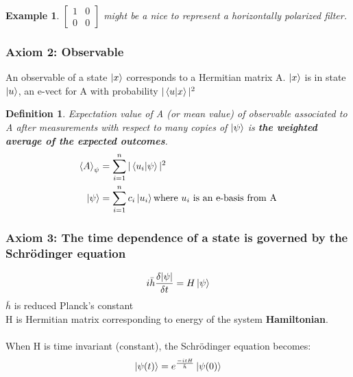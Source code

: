 \documentclass[12pt]{article}
\theoremstyle{plain}
\theoremstyle{nonumberplain}
\theoremstyle{plain}
\newtheorem{definition}[lemma]{Definition}
\newtheorem{example}[lemma]{Example}
\theoremstyle{nonumberplain}
\newcommand\1{{\bf 1}}
\newcommand{\bmat}[1]{\begin{bmatrix*} #1 \end{bmatrix*}} %
\newcommand{\<}{\left\langle}
\renewcommand{\>}{\right\rangle}
\begin{document}
\begin{example}
$\bmat{1& 0\\ 0& 0}$ might be a nice to represent a horizontally polarized filter.  
\end{example}

\subsubsection{Axiom 2: Observable} An observable of a state $\ket{x}$ corresponds to a Hermitian matrix A. $\ket{x}$ is in state $\ket{u}$, an e-vect for A with probability $|\braket{u|x}|^2$\\

\begin{definition}
Expectation value of A (or mean value) of observable associated to A after measurements with respect to many copies of $\ket{\psi}$ is \textbf{the weighted average of the expected outcomes}.
\begin{equation*}
\begin{split}
\braket{A}_\psi &= \sum_{i=1}^{n} |\braket{u_i|\psi}|^2\\
\ket{\psi} &= \sum_{i=1}^{n} c_i \ket{u_i} \text{where $u_i$ is an e-basis from A}
\end{split}
\end{equation*}
\end{definition}

\subsubsection{Axiom 3: The time dependence of a state is governed by the Schrödinger equation}
\begin{equation}
i\bar{h}\frac{\delta|\psi|}{\delta t} = H\ket{\psi}
\end{equation}
$\bar{h}$ is reduced Planck's constant\\
H is Hermitian matrix corresponding to energy of the system \textbf{Hamiltonian}. \\
\\
When H is time invariant (constant), the Schrödinger equation becomes:
\begin{equation}
\ket{\psi (t)} = e^{\frac{-itH}{\bar{h}}}\ket{\psi (0)}
\end{equation}

\pagebreak
\end{document}
